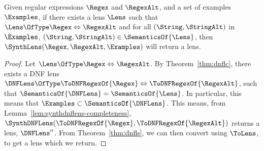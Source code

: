 \documentclass[sigplan,acmsmall]{acmart}
\begin{document}
\begin{theorem}
  Given regular expressions $\Regex$ and $\RegexAlt$, and a set
  of examples $\Examples$, if there exists a lens $\Lens$ such that
  $\Lens \OfType \Regex \Leftrightarrow \RegexAlt$ and for all
  $(\String,\StringAlt)$ in $\Examples$, $(\String,\StringAlt) \in
  \SemanticsOf{\Lens}$, then $\SynthLens(\Regex,\RegexAlt,\Examples)$ will
  return a lens.
\end{theorem}
\begin{proof}
  Let $\Lens \OfType \Regex \Leftrightarrow \RegexAlt$.  By
  Theorem~\ref{thm:dnflc}, there exists a DNF lens $\DNFLens \OfType \ToDNFRegexOf{\Regex}
  \Leftrightarrow \ToDNFRegexOf{\RegexAlt}$, such that $\SemanticsOf{\DNFLens} =
  \SemanticsOf{\Lens}$.  In particular, this means that $\Examples \subset
  \SemanticsOf{\DNFLens}$.  This means, from
  Lemma~\ref{lem:synthdnflens-completeness},
  $\SynthDNFLens(\ToDNFRegexOf{\Regex},\ToDNFRegexOf{\RegexAlt})$ returns a
  lens, $\DNFLens''$.  From Theorem~\ref{thm:dnfls}, we can then convert using
  $\ToLens$, to get a lens which we return.
\end{proof}

%
\end{document}

